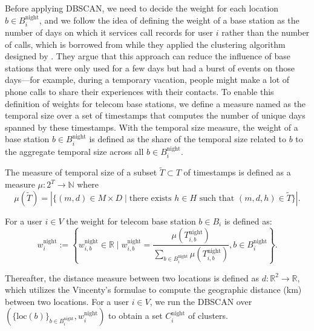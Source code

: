 Before applying DBSCAN, we need to decide the weight for each location $b \in B^{\text{night}}_i$, and we follow the idea of defining the weight of a base station as the number of days on which it services call records for user $i$ rather than the number of calls, which is borrowed from \cite{isaacman2011identifying} while they applied the clustering algorithm designed by \cite{hartigan1975clustering}. They argue that this approach can reduce the influence of base stations that were only used for a few days but had a burst of events on those days—for example, during a temporary vacation, people might make a lot of phone calls to share their experiences with their contacts. To enable this definition of weights for telecom base stations, we define a measure named as the temporal size over a set of timestamps that computes the number of unique days spanned by these timestamps. With the temporal size measure, the weight of a base station $b \in B^{\text{night}}_i$ is defined as the share of the temporal size related to $b$ to the aggregate temporal size across all $b \in B^{\text{night}}_i$.

\begin{function}
The measure of temporal size of a subset $\tilde{T} \subset T$ of timestamps is defined as a measure  $\mu: 2^T \rightarrow \mathbb{N}$ where
\begin{equation}\label{eq:temporal_size}
\mu(\tilde{T}) =
|
\{
(m, d) \in M \times D
\mid
\text{there exists } h \in H \text{ such that } (m, d, h) \in \tilde{T}
\}
|.
\end{equation}
\end{function}

\label{def:temporal_size}
\begin{definition}
For a user $i \in V$ the weight for telecom base station $b \in B_i$ is defined as:
\[
w_i^{\text{night}}
:= \left\{
    w^{\text{night}}_{i, b} \in \mathbb{R}
    \mid
    w^{\text{night}}_{i, b} = \frac{\mu(T^{\text{night}}_{i, b})}{\sum_{b \in B^\text{night}_i} \mu(T^{\text{night}}_{i, b})}, b \in B^{\text{night}}_i
\right\}.
\]
\end{definition}

Thereafter, the distance measure between two locations is defined as $d: \mathbb{R}^2 \rightarrow \mathbb{R}$, which utilizes the Vincenty's formulae to compute the geographic distance (km) between two locations. For a user $i \in V$, we run the DBSCAN over $(\{\text{loc}(b)\}_{b \in B^{\text{night}}_i}, w^{\text{night}}_i)$ to obtain a set $C^{\text{night}}_i$ of clusters.

